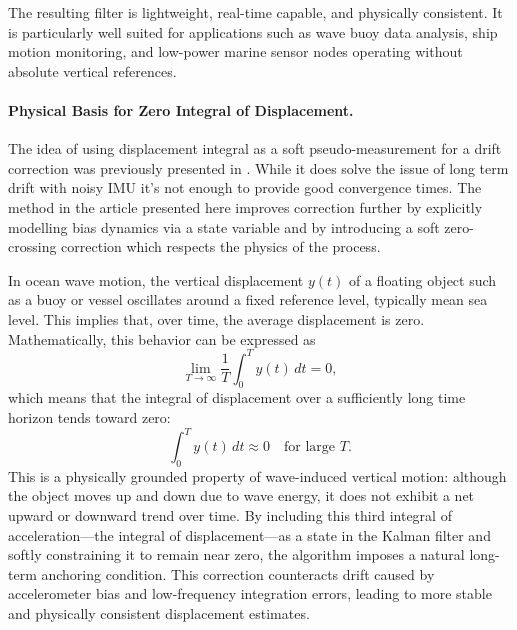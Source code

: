 \documentclass[11pt,letterpaper]{article}
\begin{document}
The resulting filter is lightweight, real-time capable, and physically consistent. It is particularly well suited for applications such as wave buoy data analysis, ship motion monitoring, and low-power marine sensor nodes operating without absolute vertical references.

\paragraph{Physical Basis for Zero Integral of Displacement.}
The idea of using displacement integral as a soft pseudo-measurement for a drift correction was previously presented in \cite{Sharkh2014}. While it does solve the issue of long term drift with noisy IMU it's not enough to provide good convergence times. The method in the article presented here improves correction further by explicitly modelling bias dynamics via a state variable and by introducing
a soft zero-crossing correction which respects the physics of the process.

In ocean wave motion, the vertical displacement \( y(t) \) of a floating object such as a buoy or vessel oscillates around a fixed reference level, typically mean sea level. This implies that, over time, the average displacement is zero. Mathematically, this behavior can be expressed as
\begin{equation}
\lim_{T \to \infty} \frac{1}{T} \int_0^T y(t) \, dt = 0,
\end{equation}
which means that the integral of displacement over a sufficiently long time horizon tends toward zero:
\begin{equation}
\int_0^T y(t) \, dt \approx 0 \quad \text{for large } T.
\end{equation}
This is a physically grounded property of wave-induced vertical motion: although the object moves up and down due to wave energy, it does not exhibit a net upward or downward trend over time. By including this third integral of acceleration---the integral of displacement---as a state in the Kalman filter and softly constraining it to remain near zero, the algorithm imposes a natural long-term anchoring condition. This correction counteracts drift caused by accelerometer bias and low-frequency integration errors, leading to more stable and physically consistent displacement estimates.
\end{document}
